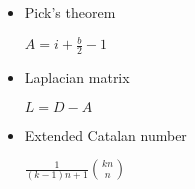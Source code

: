 \begin{itemize}

    \item Pick's theorem

    $A=i+\frac{b}{2}-1$

    \item Laplacian matrix

    $L = D - A$

    \item Extended Catalan number

    $\frac{1}{(k-1)n+1} {kn\choose n}$

\end{itemize}
